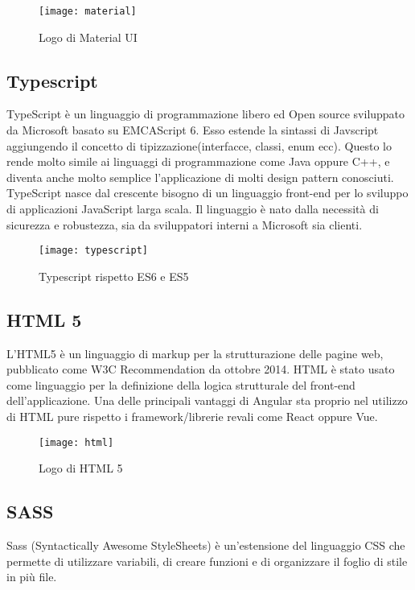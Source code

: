 \begin{figure}[!h] 
	\centering 
	\texttt{[image: material]}
	\caption{Logo di Material UI} 
\end{figure}


\subsection{Typescript} TypeScript è un linguaggio di programmazione libero ed Open source sviluppato da Microsoft basato su EMCAScript 6. Esso estende la sintassi di Javscript aggiungendo il concetto di tipizzazione(interfacce, classi, enum ecc). Questo lo rende molto simile ai linguaggi di programmazione come Java oppure C++, e diventa anche molto semplice l'applicazione di molti design pattern conosciuti.
\\

 TypeScript nasce dal crescente bisogno di un linguaggio front-end per lo sviluppo di applicazioni JavaScript larga scala. Il linguaggio è nato dalla necessità di sicurezza e robustezza, sia da sviluppatori interni a Microsoft sia clienti. 
\begin{figure}[!h] 
	\centering 
	\texttt{[image: typescript]} 
	\caption{Typescript rispetto ES6 e ES5}
\end{figure}


\subsection{HTML 5} L'HTML5 è un linguaggio di markup per la strutturazione delle pagine web, pubblicato come W3C Recommendation da ottobre 2014. HTML è stato usato come linguaggio per la definizione della logica strutturale del
front-end dell’applicazione. Una delle principali vantaggi di Angular sta proprio nel utilizzo di HTML pure rispetto i framework/librerie revali come React oppure Vue. 
\begin{figure}[!h] 
	\centering 
	\texttt{[image: html]} 
	\caption{Logo di HTML 5}
\end{figure}

\subsection{SASS} Sass (Syntactically Awesome StyleSheets) è un'estensione del linguaggio CSS che permette di utilizzare variabili, di creare funzioni e di organizzare il foglio di stile in più file.
\\


